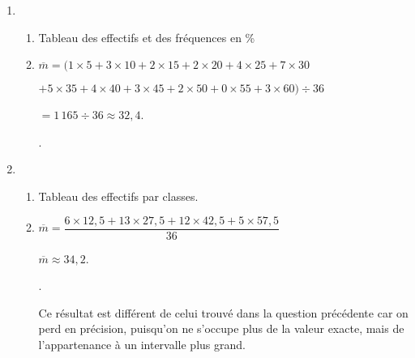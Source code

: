 \begin{Maquette}[Fiche,CorrigeFin,Colonnes=2]{}
\begin{multicols}{2}
      \begin{Solution}
         \begin{enumerate}
            \item
               \begin{enumerate}
                  \item Tableau des effectifs et des fréquences en \% \par \smallskip
                     \hspace*{-15mm}
                     {\small {}} \smallskip
                  \item $\overline{m} =(1\times5+3\times10+2\times15+2\times20+4\times25+7\times30$ \par
                     $+5\times35+4\times40+3\times45+2\times50+0\times55+3\times60)\div36$ \par
                     $=1\,165\div36 \approx32,4$. \par
                  .
               \end{enumerate}   
            \item
               \begin{enumerate}
                  \item Tableau des effectifs par classes. \par \smallskip
                     {\small
                      } \medskip
                  \item $\overline{m} =\dfrac{6\times12,5+13\times27,5+12\times42,5+5\times57,5}{36}$ \par
                     $\overline{m} \approx 34,2$. \par
                     . \par
                     Ce résultat est différent de celui trouvé dans la question précédente car on perd en précision, puisqu'on ne s'occupe plus de la valeur exacte, mais de l'appartenance à un intervalle plus grand.
               \end{enumerate}
         \end{enumerate}
      \end{Solution}
      

\end{multicols}
\end{Maquette}
